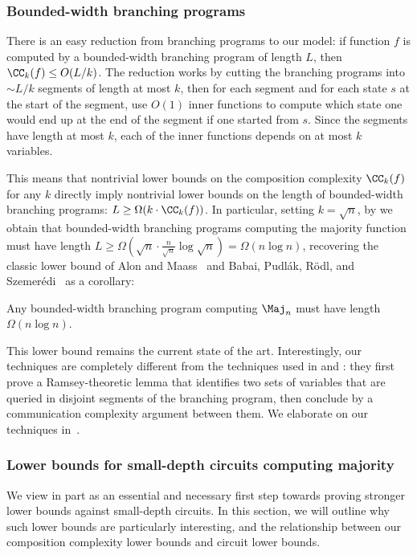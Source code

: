 \subsubsection{Bounded-width branching programs}
There is an easy reduction from branching programs to our model: if function $f$ is computed by a bounded-width branching program of length $L$,
then $\CC_k(f) \leq O(L/k)$.
The reduction works by cutting the branching programs into $\sim L/k$ segments of length at most $k$, then for each segment and for each state $s$ at the start of the segment, use
$O(1)$
inner functions to compute which state one would end up at the end of the segment if one started from $s$.
Since the segments have length at most $k$, each of the inner functions depends on at most $k$ variables.

This means that nontrivial lower bounds on the composition complexity $\CC_k(f)$ for any $k$ directly imply nontrivial lower bounds on the length of bounded-width branching programs: $L \geq \Omega(k \cdot \CC_k(f))$.
In particular, setting $k=\sqrt{n}$, by  we obtain that bounded-width branching programs computing the majority function must have length $L \geq \Omega(\sqrt{n} \cdot \frac{n}{\sqrt{n}} \log \sqrt{n}) = \Omega(n \log n)$, recovering the classic lower bound of Alon and Maass~\cite{AM86} and Babai, Pudl{\'a}k, R{\"o}dl, and Szemer{\'e}di~\cite{BPRS90} as a corollary: 

\begin{theorem}
Any bounded-width branching program computing $\Maj_n$ must have length $\Omega(n \log n)$.
\end{theorem}

This lower bound remains the current state of the art. Interestingly, our techniques are completely different from the techniques used in \cite{AM86} and \cite{BPRS90}: they first prove a Ramsey-theoretic lemma that identifies two sets of variables that are queried in disjoint segments of the branching program, then conclude by a communication complexity argument between them. 
We elaborate on our techniques in~. 


\subsubsection{Lower bounds for small-depth circuits computing majority}
\label{sssec:link-to-small-depth}

We view  in part as an essential and necessary first step towards proving stronger lower bounds against small-depth circuits. In this section, we will outline why such lower bounds are particularly interesting, and the relationship between our composition complexity lower bounds and circuit lower bounds.



